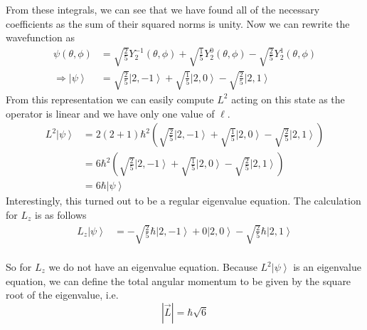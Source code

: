 \documentclass[a4paper, 11pt]{article}
\newcommand{\ket}[1]{\ensuremath{\left|#1\right\rangle}}
\newenvironment{solution}{%
	\begin{list}{}{%
			\setlength{\topsep}{0pt}%
			\setlength{\leftmargin}{1.5cm}%
			\setlength{\rightmargin}{1.5cm}%
			\setlength{\listparindent}{\parindent}%
			\setlength{\itemindent}{\parindent}%
			\setlength{\parsep}{\parskip}%
		}%
		\item[]}{\end{list}}
\begin{document}
\begin{solution}
  \noindent From these integrals, we can see that we have found all of the necessary coefficients as the sum of their squared norms is unity. Now we can rewrite the wavefunction as
  \begin{align*}
    \psi(\theta,\phi) &= \sqrt{\frac{2}{5}}Y_2^{-1}(\theta,\phi)+\sqrt{\frac{1}{5}}Y_2^0(\theta, \phi)-\sqrt{\frac{2}{5}}Y_2^1(\theta,\phi) \\
    \Rightarrow \ket{\psi} &= \sqrt{\frac{2}{5}}\ket{2,-1} + \sqrt{\frac{1}{5}}\ket{2,0}-\sqrt{\frac{2}{5}}\ket{2,1}
  \end{align*}
  From this representation we can easily compute $L^2$ acting on this state as the operator is linear and we have only one value of $\ell$.
  \begin{align*}
    L^2\ket{\psi}&= 2(2+1)\hbar^2\left( \sqrt{\frac{2}{5}}\ket{2,-1}+\sqrt{\frac{1}{5}}\ket{2,0}-\sqrt{\frac{2}{5}}\ket{2,1}\right) \\
    &= 6\hbar^2 \left( \sqrt{\frac{2}{5}}\ket{2,-1}+\sqrt{\frac{1}{5}}\ket{2,0}-\sqrt{\frac{2}{5}}\ket{2,1}\right) \\
    &= 6\hbar \ket{\psi} 
  \end{align*}
  Interestingly, this turned out to be a regular eigenvalue equation. The calculation for $L_z$ is as follows
  \begin{align*}
    L_z\ket{\psi} &= -\sqrt{\frac{2}{5}}\hbar\ket{2,-1} + 0\ket{2,0} -\sqrt{\frac{2}{5}}\hbar\ket{2,1} \\
  \end{align*}

  \noindent So for $L_z$ we do not have an eigenvalue equation. Because $L^2\ket{\psi}$ is an eigenvalue equation, we can define the total angular momentum to be given by the square root of the eigenvalue, i.e.
  \begin{equation*}
    |\vec{L}| = \hbar\sqrt{6}
  \end{equation*}
\end{solution}
\end{document}
